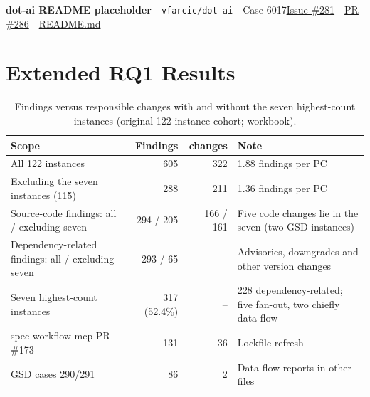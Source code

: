 \begin{casefile}{\textbf{dot-ai README placeholder}\ \ {\scriptsize\texttt{vfarcic/\allowbreak dot-ai}}\ \ {\scriptsize Case 6017}}{\href{https://github.com/vfarcic/dot-ai/issues/281}{Issue \#281}\ \ \href{https://github.com/vfarcic/dot-ai/pull/286}{PR \#286}\ \ \href{https://github.com/vfarcic/dot-ai/blob/466ccaa58eb1b86d2dab07089871102eeb497f49/examples/gateway-api/README.md}{README.md}}
\end{casefile}

\FloatBarrier
\section{Extended RQ1 Results}\label{sec:s4}

\begin{table}[H]
\caption{Findings versus responsible changes with and without the seven highest-count instances (original 122-instance cohort; workbook).}
\label{tab:concentration}
\footnotesize\renewcommand{\arraystretch}{1.12}
\begin{tabularx}{\linewidth}{@{}L{5.2cm}rrY@{}}
\toprule
\textbf{Scope} & \textbf{Findings} & \textbf{changes} & \textbf{Note}\\
\midrule
All 122 instances & 605 & 322 & 1.88 findings per PC\\
Excluding the seven instances (115) & 288 & 211 & 1.36 findings per PC\\
Source-code findings: all / excluding seven & 294 / 205 & 166 / 161 & Five code changes lie in the seven (two GSD instances)\\
Dependency-related findings: all / excluding seven & 293 / 65 & -- & Advisories, downgrades and other version changes\\
Seven highest-count instances & 317 (52.4\%) & -- & 228 dependency-related; five fan-out, two chiefly data flow\\
spec-workflow-mcp PR \#173 & 131 & 36 & Lockfile refresh\\
GSD cases 290/291 & 86 & 2 & Data-flow reports in other files\\
\bottomrule
\end{tabularx}
\end{table}

